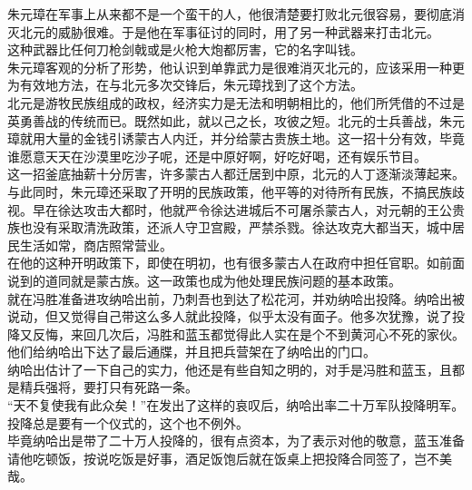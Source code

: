 \begin{multicols}{\theparacolNo}
朱元璋在军事上从来都不是一个蛮干的人，他很清楚要打败北元很容易，要彻底消灭北元的威胁很难。于是他在军事征讨的同时，用了另一种武器来打击北元。\\

这种武器比任何刀枪剑戟或是火枪大炮都厉害，它的名字叫钱。\\

朱元璋客观的分析了形势，他认识到单靠武力是很难消灭北元的，应该采用一种更为有效地方法，在与北元多次交锋后，朱元璋找到了这个方法。\\

北元是游牧民族组成的政权，经济实力是无法和明朝相比的，他们所凭借的不过是英勇善战的传统而已。既然如此，就以己之长，攻彼之短。北元的士兵善战，朱元璋就用大量的金钱引诱蒙古人内迁，并分给蒙古贵族土地。这一招十分有效，毕竟谁愿意天天在沙漠里吃沙子呢，还是中原好啊，好吃好喝，还有娱乐节目。\\

这一招釜底抽薪十分厉害，许多蒙古人都迁居到中原，北元的人丁逐渐淡薄起来。\\

与此同时，朱元璋还采取了开明的民族政策，他平等的对待所有民族，不搞民族歧视。早在徐达攻击大都时，他就严令徐达进城后不可屠杀蒙古人，对元朝的王公贵族也没有采取清洗政策，还派人守卫宫殿，严禁杀戮。徐达攻克大都当天，城中居民生活如常，商店照常营业。\\

在他的这种开明政策下，即使在明初，也有很多蒙古人在政府中担任官职。如前面说到的道同就是蒙古族。这一政策也成为他处理民族问题的基本政策。\\

就在冯胜准备进攻纳哈出前，乃刺吾也到达了松花河，并劝纳哈出投降。纳哈出被说动，但又觉得自己带这么多人就此投降，似乎太没有面子。他多次犹豫，说了投降又反悔，来回几次后，冯胜和蓝玉都觉得此人实在是个不到黄河心不死的家伙。他们给纳哈出下达了最后通牒，并且把兵营架在了纳哈出的门口。\\

纳哈出估计了一下自己的实力，他还是有些自知之明的，对手是冯胜和蓝玉，且都是精兵强将，要打只有死路一条。\\

“天不复使我有此众矣！”在发出了这样的哀叹后，纳哈出率二十万军队投降明军。\\

投降总是要有一个仪式的，这个也不例外。\\

毕竟纳哈出是带了二十万人投降的，很有点资本，为了表示对他的敬意，蓝玉准备请他吃顿饭，按说吃饭是好事，酒足饭饱后就在饭桌上把投降合同签了，岂不美哉。\\


\end{multicols}
